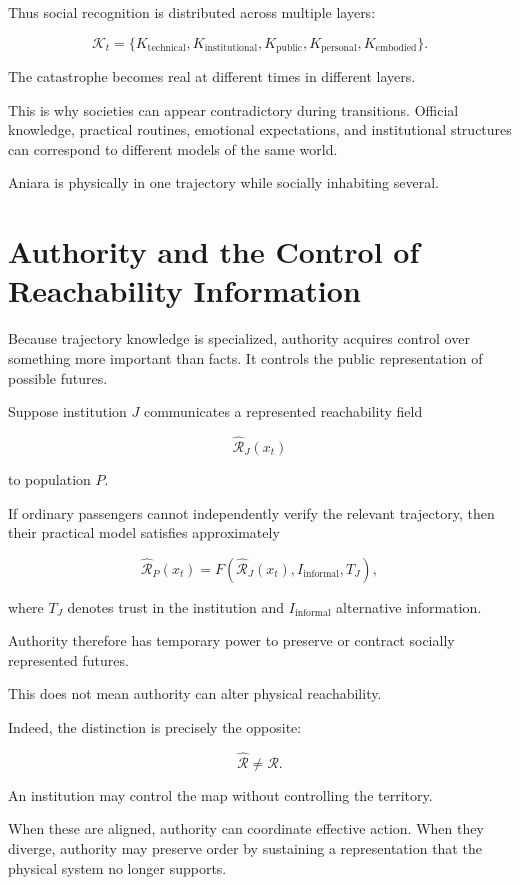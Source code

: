 \documentclass[11pt,oneside]{book}
\theoremstyle{definition}
\theoremstyle{remark}
\newcommand{\R}{\mathcal{R}}
\begin{document}
Thus social recognition is distributed across multiple layers:

\[
\mathcal K_t
=
\{
K_{\mathrm{technical}},
K_{\mathrm{institutional}},
K_{\mathrm{public}},
K_{\mathrm{personal}},
K_{\mathrm{embodied}}
\}.
\]

The catastrophe becomes real at different times in different layers.

This is why societies can appear contradictory during transitions. Official knowledge, practical routines, emotional expectations, and institutional structures can correspond to different models of the same world.

Aniara is physically in one trajectory while socially inhabiting several.

\section{Authority and the Control of Reachability Information}

Because trajectory knowledge is specialized, authority acquires control over something more important than facts. It controls the public representation of possible futures.

Suppose institution \(J\) communicates a represented reachability field

\[
\widehat{\R}_J(x_t)
\]

to population \(P\).

If ordinary passengers cannot independently verify the relevant trajectory, then their practical model satisfies approximately

\[
\widehat{\R}_P(x_t)
=
F\!\left(
\widehat{\R}_J(x_t),
I_{\mathrm{informal}},
T_J
\right),
\]

where \(T_J\) denotes trust in the institution and \(I_{\mathrm{informal}}\) alternative information.

Authority therefore has temporary power to preserve or contract socially represented futures.

This does not mean authority can alter physical reachability.

Indeed, the distinction is precisely the opposite:

\[
\widehat{\R}
\neq
\R.
\]

An institution may control the map without controlling the territory.

When these are aligned, authority can coordinate effective action. When they diverge, authority may preserve order by sustaining a representation that the physical system no longer supports.
\end{document}
